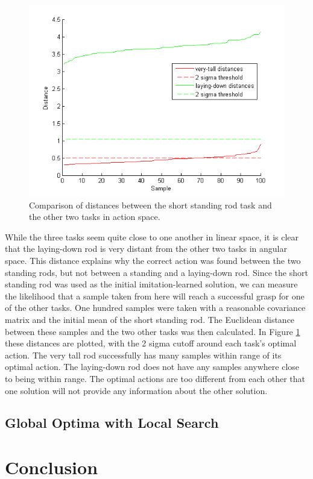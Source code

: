 \documentclass[12pt]{article}
\begin{document}
\begin{figure}[ht]
  \centering
  \includegraphics[width=0.8\columnwidth]{distance.png}
  \caption{\label{fig_label} Comparison of distances between the short standing rod task and the other two tasks in action space.}
  \label{fig:distance}
\end{figure}

\newpage
While the three tasks seem quite close to one another in linear space, it is clear that the laying-down rod is very distant from the other two tasks in angular space. This distance explains why the correct action was found between the two standing rods, but not between a standing and a laying-down rod. Since the short standing rod was used as the initial imitation-learned solution, we can measure the likelihood that a sample taken from here will reach a successful grasp for one of the other tasks. One hundred samples were taken with a reasonable covariance matrix and the initial mean of the short standing rod. The Euclidean distance between these samples and the two other tasks was then calculated. In Figure \ref{fig:distance} these distances are plotted, with the 2 sigma cutoff around each task's optimal action. The very tall rod successfully has many samples within range of its optimal action. The laying-down rod does not have any samples anywhere close to being within range. The optimal actions are too different from each other that one solution will not provide any information about the other solution.

\subsection{Global Optima with Local Search}

\section{Conclusion}
\end{document}
